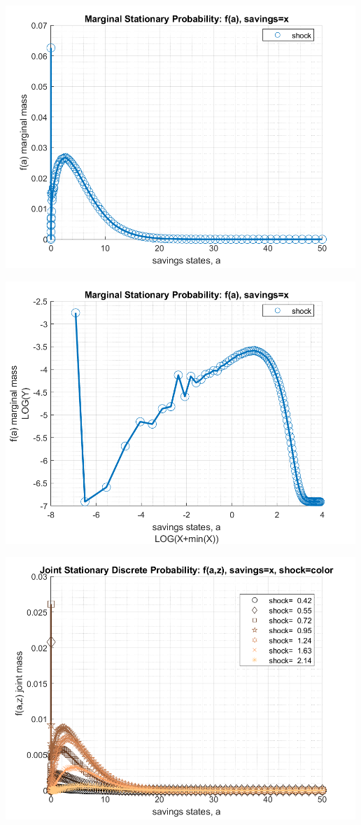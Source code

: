 \documentclass[
]{book}
\begin{document}
\includegraphics[width=5.20833in,height=\textheight]{img/fx_ds_az_cts_vec_images/figure_2.png}

\includegraphics[width=5.20833in,height=\textheight]{img/fx_ds_az_cts_vec_images/figure_3.png}

\includegraphics[width=5.20833in,height=\textheight]{img/fx_ds_az_cts_vec_images/figure_4.png}
\end{document}
